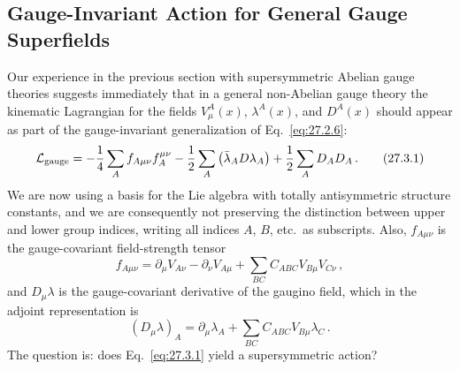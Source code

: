 
\subsection{Gauge-Invariant Action for General Gauge Superfields}

Our experience in the previous section with supersymmetric Abelian gauge
theories suggests immediately that in a general non-Abelian gauge theory
the kinematic Lagrangian for the fields \(V_\mu^A(x)\), \(\lambda^A(x)\),
and \(D^A(x)\) should appear as part of the gauge-invariant generalization
of Eq.~\eqref{eq:27.2.6}:
\begin{equation}
  \mathcal{L}_{\mathrm{gauge}}
  =-\frac14\sum_A f_{A\mu\nu}f_A^{\mu\nu}
  -\frac12\sum_A\left(\bar\lambda_A\sl{D}\lambda_A\right)
  +\frac12\sum_A D_A D_A\,.
  \tag{27.3.1}\label{eq:27.3.1}
\end{equation}
We are now using a basis for the Lie algebra with totally antisymmetric
structure constants, and we are consequently not preserving the distinction
between upper and lower group indices, writing all indices \(A\), \(B\), etc.\
as subscripts. Also, \(f_{A\mu\nu}\) is the gauge-covariant field-strength
tensor
\begin{equation}
  f_{A\mu\nu}
  =\partial_\mu V_{A\nu}-\partial_\nu V_{A\mu}
  +\sum_{BC}C_{ABC}V_{B\mu}V_{C\nu}\,,
  \tag{27.3.2}\label{eq:27.3.2}
\end{equation}
and \(D_\mu\lambda\) is the gauge-covariant derivative of the gaugino field,
which in the adjoint representation is
\begin{equation}
  (D_\mu\lambda)_A
  =\partial_\mu\lambda_A+\sum_{BC}C_{ABC}V_{B\mu}\lambda_C\,.
  \tag{27.3.3}\label{eq:27.3.3}
\end{equation}
The question is: does Eq.~\eqref{eq:27.3.1} yield a supersymmetric action?


